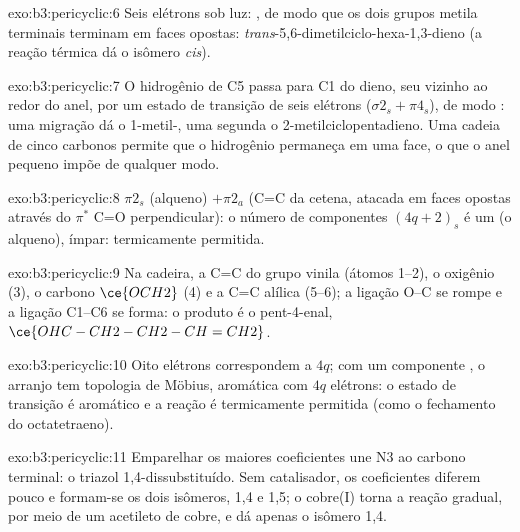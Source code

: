 \begin{solution}{exo:b3:pericyclic:6}
Seis elétrons sob luz: , de modo que os dois grupos metila terminais terminam em
faces opostas: \textit{trans}-5,6-dimetilciclo-hexa-1,3-dieno (a reação térmica dá
o isômero \textit{cis}).
\end{solution}

\begin{solution}{exo:b3:pericyclic:7}
O hidrogênio de C5 passa para C1 do dieno, seu vizinho ao redor do anel,
por um estado de transição de seis elétrons ($\sigma2_s + \pi4_s$), de modo : uma migração
dá o 1-metil-, uma segunda o 2-metilciclopentadieno. Uma cadeia de cinco carbonos permite que o
hidrogênio permaneça em uma face, o que o anel pequeno impõe de qualquer modo.
\end{solution}

\begin{solution}{exo:b3:pericyclic:8}
$\pi2_s$ (alqueno) $+ \pi2_a$ (C=C da cetena, atacada em faces opostas através do
$\pi^*$ C=O perpendicular): o número de componentes $(4q + 2)_s$ é um (o alqueno), ímpar:
termicamente permitida.
\end{solution}

\begin{solution}{exo:b3:pericyclic:9}
Na cadeira, a C=C do grupo vinila (átomos 1--2), o oxigênio (3), o carbono
$\ce{OCH2}$ (4) e a C=C alílica (5--6); a ligação O--C se rompe e a ligação C1--C6 se forma:
o produto é o pent-4-enal,
$\ce{OHC-CH2-CH2-CH=CH2}$.
\end{solution}

\begin{solution}{exo:b3:pericyclic:10}
Oito elétrons correspondem a $4q$; com um componente , o arranjo tem topologia de
Möbius, aromática com $4q$ elétrons: o estado de transição é aromático e a
reação é termicamente permitida (como o fechamento  do octatetraeno).
\end{solution}

\begin{solution}{exo:b3:pericyclic:11}
Emparelhar os maiores coeficientes une N3 ao carbono terminal: o
triazol 1,4-dissubstituído. Sem catalisador, os coeficientes diferem pouco e
formam-se os dois isômeros, 1,4 e 1,5; o cobre(I) torna a reação gradual, por meio de um
acetileto de cobre, e dá apenas o isômero 1,4.
\end{solution}


